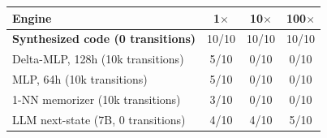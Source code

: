 \begin{tabular}{lccc}
\toprule
Engine & 1$\times$ & 10$\times$ & 100$\times$ \\
\midrule
\textbf{Synthesized code (0 transitions)} & 10/10 & 10/10 & 10/10 \\
Delta-MLP, 128h (10k transitions) & 5/10 & 0/10 & 0/10 \\
MLP, 64h (10k transitions) & 5/10 & 0/10 & 0/10 \\
1-NN memorizer (10k transitions) & 3/10 & 0/10 & 0/10 \\
LLM next-state (7B, 0 transitions) & 4/10 & 4/10 & 5/10 \\
\bottomrule
\end{tabular}
